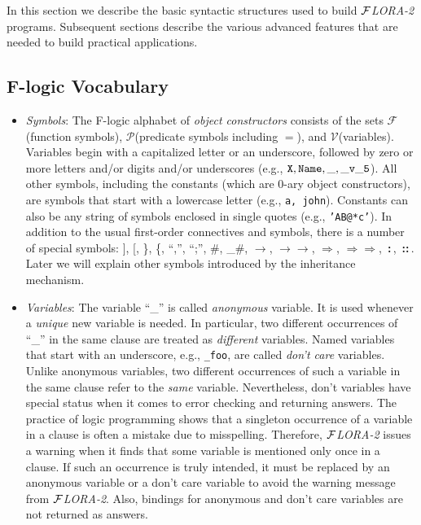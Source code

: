 \documentclass[11pt]{article}
\newcommand{\isa}{\,{\bf{:}}\,}
\newcommand{\subcl}{\,{\bf{::}}\,}
\newcommand{\fd}{\ensuremath{{\rightarrow}}}                   %
\newcommand{\mvd}{\ensuremath{{\rightarrow\!\!\!\!\rightarrow}}}  %
\newcommand{\Fd}{\ensuremath{{\Rightarrow}}}                      %
\newcommand{\Mvd}{\ensuremath{{\Rightarrow\!\!\!\!\Rightarrow}}}  %
\newcommand{\FLORA}{{\mbox{${\cal F}${\small\it LORA}\rm\emph{-2}}}\xspace}
\newcommand{\fl}{\mbox{F-logic}\xspace}
\newcommand{\funcs}{\ensuremath{\mathcal{F}}}
\newcommand{\preds}{\ensuremath{\mathcal{P}}}
\newcommand{\vars}{\ensuremath{\mathcal{V}}}
\begin{document}
In this section we describe the basic syntactic structures used to build
\FLORA programs. Subsequent sections describe the various advanced features
that are needed to build practical applications.


\subsection{\fl Vocabulary}\label{sec-basic-flogic}


\begin{itemize}
\item \emph{Symbols}: The \fl alphabet of \emph{object constructors}
  consists of the sets \funcs (function symbols), \preds (predicate symbols
  including $=$), and \vars (variables).  Variables begin with a
  capitalized letter or an underscore, followed by zero or more letters
  and/or digits and/or underscores (e.g., $\tt X, Name, \_, \_v\_5$).
  All other symbols, including the constants (which are 0-ary object
  constructors), are symbols that start with a lowercase letter (e.g., {\tt a,
  john}). Constants can also be any string of symbols enclosed in single
  quotes (e.g., {\tt 'AB@*c'}). 
  In addition to the usual first-order connectives and symbols, there is a
  number of special symbols:
  ], [, \}, \{, ``,'', ``;'', \#, \_\#, \fd, \mvd, \Fd,
  \Mvd, \isa, \subcl. Later we will explain other symbols introduced by
  the inheritance mechanism.
  
\item \emph{Variables}: The variable ``\_'' is called \emph{anonymous}
  variable. It is used whenever a \emph{unique} new variable is needed.  In
  particular, two different occurrences of ``\_'' in the same clause are
  treated as \emph{different} variables. Named variables that start with an
  underscore, e.g., {\tt \_foo}, are called \emph{don't care} variables.
  Unlike anonymous variables, two different occurrences of such a variable
  in the same clause refer to the \emph{same} variable. Nevertheless, don't
  variables have special status when it comes to error checking
  and returning answers.  The practice of logic programming shows that a
  singleton occurrence of a variable in a clause is often a mistake due to
  misspelling. Therefore, \FLORA issues a warning when it finds that some
  variable is mentioned only once in a clause. If such an occurrence is
  truly intended, it must be replaced by an anonymous variable or a don't
  care variable to avoid the warning message from \FLORA. Also, bindings
  for anonymous and don't care variables are not returned as answers.


\end{itemize}
\end{document}
